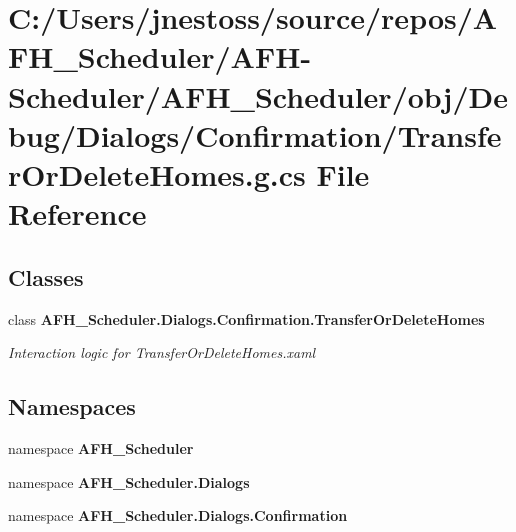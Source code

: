 \section{C\+:/\+Users/jnestoss/source/repos/\+A\+F\+H\+\_\+\+Scheduler/\+A\+F\+H-\/\+Scheduler/\+A\+F\+H\+\_\+\+Scheduler/obj/\+Debug/\+Dialogs/\+Confirmation/\+Transfer\+Or\+Delete\+Homes.g.\+cs File Reference}
\label{_debug_2_dialogs_2_confirmation_2_transfer_or_delete_homes_8g_8cs}
\subsection*{Classes}
\begin{DoxyCompactItemize}
\item 
class \textbf{ A\+F\+H\+\_\+\+Scheduler.\+Dialogs.\+Confirmation.\+Transfer\+Or\+Delete\+Homes}
\begin{DoxyCompactList}\small\item\em Interaction logic for Transfer\+Or\+Delete\+Homes.\+xaml \end{DoxyCompactList}\end{DoxyCompactItemize}
\subsection*{Namespaces}
\begin{DoxyCompactItemize}
\item 
namespace \textbf{ A\+F\+H\+\_\+\+Scheduler}
\item 
namespace \textbf{ A\+F\+H\+\_\+\+Scheduler.\+Dialogs}
\item 
namespace \textbf{ A\+F\+H\+\_\+\+Scheduler.\+Dialogs.\+Confirmation}
\end{DoxyCompactItemize}
